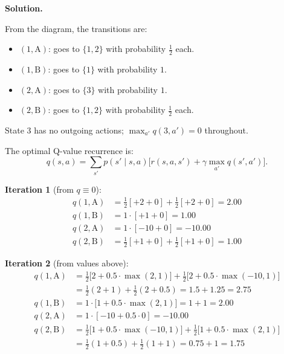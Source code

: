 \documentclass[12pt]{article}
\newenvironment{solution}{%
  \ifshowsolutions\begin{solutionbox}\noindent\textbf{\color{blue!70!black}Solution.}\quad\fi
  \ifshowsolutions\else\expandafter\comment\fi
}{%
  \ifshowsolutions\end{solutionbox}\fi
  \ifshowsolutions\else\expandafter\endcomment\fi
}
\begin{document}
\begin{enumerate}
\begin{enumerate}
        \begin{solution}
          From the diagram, the transitions are:
          \begin{itemize}
            \item $(1,\mathrm{A})$: goes to $\{1, 2\}$ with probability $\tfrac{1}{2}$ each.
            \item $(1,\mathrm{B})$: goes to $\{1\}$ with probability $1$.
            \item $(2,\mathrm{A})$: goes to $\{3\}$ with probability $1$.
            \item $(2,\mathrm{B})$: goes to $\{1, 2\}$ with probability $\tfrac{1}{2}$ each.
          \end{itemize}
          State 3 has no outgoing actions; $\max_{a'}q(3,a') = 0$ throughout.

          The optimal Q-value recurrence is:
          \[
            q(s,a) = \sum_{s'} p(s'\mid s,a)\bigl[r(s,a,s') + \gamma\max_{a'}q(s',a')\bigr].
          \]

          \textbf{Iteration 1} (from $q \equiv 0$):
          \begin{align*}
            q(1,\mathrm{A}) &= \tfrac{1}{2}[+2 + 0] + \tfrac{1}{2}[+2 + 0] = 2.00\\
            q(1,\mathrm{B}) &= 1\cdot[+1 + 0] = 1.00\\
            q(2,\mathrm{A}) &= 1\cdot[-10 + 0] = -10.00\\
            q(2,\mathrm{B}) &= \tfrac{1}{2}[+1 + 0] + \tfrac{1}{2}[+1 + 0] = 1.00
          \end{align*}

          \textbf{Iteration 2} (from values above):
          \begin{align*}
            q(1,\mathrm{A}) &= \tfrac{1}{2}\bigl[2 + 0.5\cdot\max(2,1)\bigr] + \tfrac{1}{2}\bigl[2 + 0.5\cdot\max(-10,1)\bigr]\\
                            &= \tfrac{1}{2}(2+1) + \tfrac{1}{2}(2+0.5) = 1.5 + 1.25 = 2.75\\[4pt]
            q(1,\mathrm{B}) &= 1\cdot\bigl[1 + 0.5\cdot\max(2,1)\bigr] = 1 + 1 = 2.00\\[4pt]
            q(2,\mathrm{A}) &= 1\cdot[-10 + 0.5\cdot 0] = -10.00\\[4pt]
            q(2,\mathrm{B}) &= \tfrac{1}{2}\bigl[1 + 0.5\cdot\max(-10,1)\bigr] + \tfrac{1}{2}\bigl[1 + 0.5\cdot\max(2,1)\bigr]\\
                            &= \tfrac{1}{2}(1+0.5) + \tfrac{1}{2}(1+1) = 0.75 + 1 = 1.75
          \end{align*}


\end{solution}
\end{enumerate}
\end{enumerate}
\end{document}
